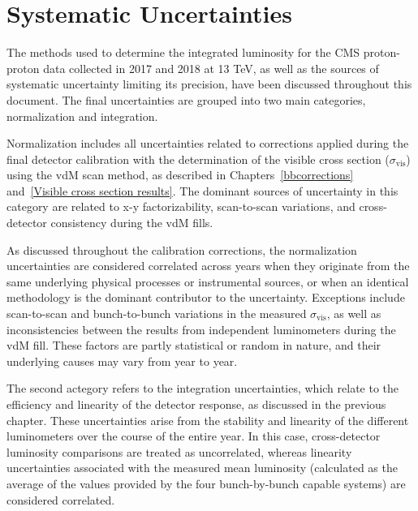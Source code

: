 

\section{Systematic Uncertainties}


The methods used to determine the integrated luminosity for the CMS proton-proton data collected in 2017 and 2018 at 13 TeV, as well as the sources of systematic uncertainty limiting its precision, have been discussed throughout this document. The final uncertainties are grouped into two main categories, normalization and integration. 


Normalization includes all uncertainties related to corrections applied during the final detector calibration with the determination of the visible cross section ($\sigma_{\text{vis}}$) using the vdM scan method, as described in Chapters~\ref{bbcorrections} and~\ref{Visible cross section results}. The dominant sources of uncertainty in this category are related to x-y factorizability, scan-to-scan variations, and cross-detector consistency during the vdM fills.

As discussed throughout the calibration corrections, the normalization uncertainties are considered correlated across years when they originate from the same underlying physical processes or instrumental sources, or when an identical methodology is the dominant contributor to the uncertainty. Exceptions include scan-to-scan and bunch-to-bunch variations in the measured $\sigma_{\text{vis}}$, as well as inconsistencies between the results from independent luminometers during the vdM fill. These factors are partly statistical or random in nature, and their underlying causes may vary from year to year.

The second actegory refers to the integration uncertainties, which relate to the efficiency and linearity of the detector response, as discussed in the previous chapter. These uncertainties arise from the stability and linearity of the different luminometers over the course of the entire year. In this case, cross-detector luminosity comparisons are treated as uncorrelated, whereas linearity uncertainties associated with the measured mean luminosity (calculated as the average of the values provided by the four bunch-by-bunch capable systems) are considered correlated.



